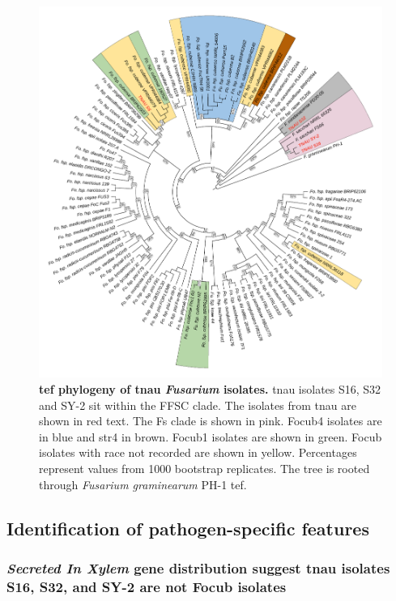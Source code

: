 \begin{figure}[htp!]
    \centering
    \includegraphics[width=14cm]{Figures/TEF1-aPhylo3.pdf}
    \caption[\Acl{tef} phylogeny of \acl{tnau} \textit{Fusarium} isolates.]{\textbf{\Acl{tef} phylogeny of \acl{tnau} \textit{Fusarium} isolates.} \Ac{tnau} isolates S16, S32 and SY-2 sit within the \acf{FFSC} clade. The isolates from \ac{tnau} are shown in red text. The \acf{Fs} clade is shown in pink. \Acf{Focub4} isolates are in blue and \acf{str4} in brown. \Acf{Focub1} isolates are shown in green. \acf{Focub} isolates with race not recorded are shown in yellow. Percentages represent values from 1000 bootstrap replicates. The tree is rooted through \textit{Fusarium graminearum} PH-1 \ac{tef}.}
    \label{fig:TEF1aPhylo}
\end{figure}
\bigskip

\subsection{Identification of pathogen-specific features}

\subsubsection{\textit{Secreted In Xylem} gene distribution suggest \ac{tnau} isolates S16, S32, and SY-2 are not \ac{Focub} isolates}

